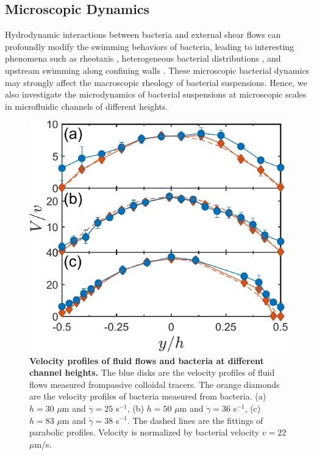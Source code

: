 \subsection{Microscopic Dynamics}
Hydrodynamic interactions between bacteria and external shear flows can profoundly modify the swimming behaviors of bacteria, leading to interesting phenomena such as rheotaxis \cite{Marcos2012}, heterogeneous bacterial distributions \cite{Rusconi2014}, and upstream swimming along confining walls \cite{Hill2007, Nash2010, Costanzo2012, Kaya2012}. These microscopic bacterial dynamics may strongly affect the macroscopic rheology of bacterial suspensions. Hence, we also investigate the microdynamics of bacterial suspensions at microscopic scales in microfluidic channels of different heights.

\begin{figure}[!ht]
	\begin{center}
	\includegraphics[width=4 in]{Figs/3-Rheo/3.pdf}
	\end{center}
	\caption[Velocity Profiles of Fluid Flows and Bacteria at Different Channel Heights]
	{
	\textbf{Velocity profiles of fluid flows and bacteria at different channel heights.}
  The blue disks are the velocity profiles of fluid flows measured frompassive colloidal tracers. The orange diamonds are the velocity profiles of bacteria measured from bacteria.
  (a) $h = 30$ $\mu$m and $\dot\gamma = 25$ s$^{-1}$,
  (b) $h = 50$ $\mu$m and $\dot\gamma = 36$ s$^{-1}$,
  (c) $h = 83$ $\mu$m and $\dot\gamma = 38$ s$^{-1}$.
  The dashed lines are the fittings of parabolic profiles. Velocity is normalized by bacterial velocity $v = 22$ $\mu$m/s.
	}
	\label{fig:3-velocity-profile}
\end{figure}

